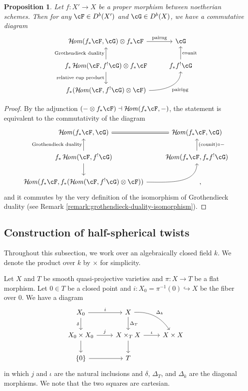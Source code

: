 \documentclass[12pt]{amsart}
\numberwithin{equation}{section}
\theoremstyle{plain}
\newtheorem{proposition}[theorem]{Proposition}
\theoremstyle{definition}
\DeclareMathOperator{\CHom}{\mathcal{H}\!\mathit{om}}
\begin{document}
\begin{proposition}\label{prop:relative-cup-product-and-Grothendieck-duality}
    Let $f \colon X' \to X$ be a proper morphism between noetherian schemes.
    Then for any $\cF \in D^b(X')$ and $\cG \in D^b(X)$, we have a commutative diagram
    \[
        \begin{tikzcd}
            \CHom(f_*\cF, \cG)\otimes f_*\cF \ar[r, "\text{pairng}"] & \cG \\
            f_*\CHom(\cF, f^!\cG)\otimes f_*\cF \ar[d, "\text{relative cup product}"']\ar[u, "\text{Grothendieck duality}"]& f_*f^!\cG \ar[u, "\text{counit}"'] \\
            f_*(\CHom(\cF, f^!\cG)\otimes \cF) \ar[ru, out=0, in=-90, "\text{pairing}"'] & \quad .
        \end{tikzcd}
    \]
\end{proposition}
\begin{proof}
    By the adjunction $(-\otimes f_*\cF) \dashv \CHom(f_*\cF, -)$, the statement is equivalent to the commutativity of the diagram
    \[
        \begin{tikzcd}
            \CHom(f_*\cF, \cG) \ar[r, equal] & \CHom(f_*\cF, \cG)\\
            f_*\CHom(\cF, f^!\cG) \ar[u, "\text{Grothendieck duality}"]\ar[d]& \CHom(f_*\cF, f_*f^!\cG)\ar[u, "(\text{counit}) \circ -"']\\
            \CHom(f_*\cF, f_*(\CHom(\cF, f^!\cG)\otimes \cF)) \ar[ru, out=0, in=-90]& \quad,
        \end{tikzcd}
    \]
    and it commutes by the very definition of the isomorphism of Grothendieck duality (see Remark \ref{remark:grothendieck-duality-isomorphism}).
\end{proof}



\subsection{Construction of half-spherical twists}
Throughout this subsection, we work over an algebraically closed field $k$.
We denote the product over $k$ by $\times$ for simplicity.

Let $X$ and $T$ be smooth quasi-projective varieties and $\pi \colon X \to T$ be a flat morphism.
Let $0 \in T$ be a closed point and $i \colon X_0 = \pi^{-1}(0) \hookrightarrow X$ be the fiber over $0$.
We have a diagram
\[
    \begin{tikzcd}
        X_0 \arrow[r,"i"]\arrow[d, "\delta"'] & X \arrow[d,"\Delta_T"]\arrow[rd, bend left, "\Delta_k"]&\\
        X_0 \times X_0 \arrow[r, "j"] \ar[d]& X \times_T X\arrow[r, "\iota"] \ar[d]&X \times X \\
        \{0\} \ar[r] & T &
    \end{tikzcd}
\]
in which $j$ and $\iota$ are the natural inclusions and $\delta$, $\Delta_T$, and $\Delta_k$ are the diagonal morphisms.
We note that the two squares are cartesian.
\end{document}
